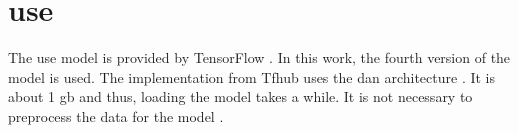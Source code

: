 \section{\ac{use}}\label{sec:impl-use}

The \ac{use} model is provided by TensorFlow \cite{HfsentTrans2019}.
In this work, the fourth version of the model is used.
The implementation from Tfhub uses the \ac{dan} architecture \cite{UniversalSentEnc-dev}.
It is about 1 \ac{gb} and thus, loading the model takes a while.
It is not necessary to preprocess the data for the model \cite{UniversalSentEnc-dev}.